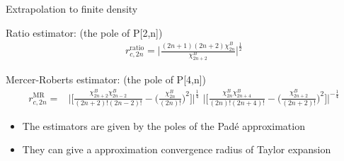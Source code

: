 \begin{frame}[fragile]{Extrapolation to finite density}
    \vspace{-0.2cm}
    \begin{block}{Ratio estimator: (the pole of P[2,n])}
        \begin{align}
            r^{\mathrm{ratio}}_{c,2n}=\bigg| \frac{(2n+1)(2n+2)\chi^B_{2n}}{\chi^B_{2n+2}} \bigg|^{\frac{1}{2}}
        \end{align}
    \end{block}
    \begin{block}{Mercer-Roberts estimator: (the pole of P[4,n])}
    \begin{align}
            r^{\mathrm{MR}}_{c,2n}=&\bigg|\bigg[ \frac{\chi^B_{2n+2}\chi^B_{2n-2}}{(2n+2)!(2n-2)!}-\bigg(\frac{\chi^B_{2n}}{(2n)!}\bigg)^2 \bigg]\bigg|^{\frac{1}{4}}\,\,\bigg|\bigg[ \frac{\chi^B_{2n}\chi^B_{2n+4}}{(2n)!(2n+4)!}-\bigg(\frac{\chi^B_{2n+2}}{(2n+2)!}\bigg)^2 \bigg]\bigg|^{-\frac{1}{4}}
    \end{align}
    \end{block}
    \vspace{0.5cm}
    \begin{itemize}
    \item The estimators are given by the poles of the Pad\'{e} approximation 
    \item They can give a approximation convergence radius of Taylor expansion
    \end{itemize}
\end{frame}
